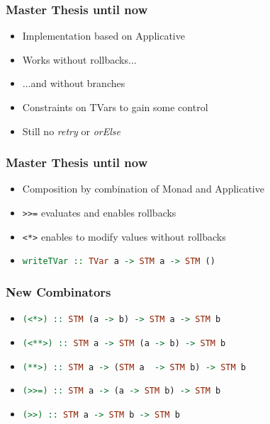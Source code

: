 \documentclass{beamer}
\begin{document}
  
  \begin{frame}
   \frametitle{Master Thesis until now}
   \begin{itemize}\setlength\itemsep{1em}
    \item Implementation based on Applicative 
    \item Works without rollbacks...
    \item ...and without branches
    \item Constraints on TVars to gain some control
    \item Still no \textit{retry} or \textit{orElse}
   \end{itemize}
  \end{frame}


  \begin{frame}
   \frametitle{Master Thesis until now}
   \begin{itemize}\setlength\itemsep{1em}
    \item Composition by combination of Monad and Applicative
    \item\lstinline{>>=} evaluates and enables rollbacks
    \item\lstinline{<*>} enables to modify values without rollbacks
    \item \lstinline[language=Haskell]{writeTVar :: TVar a -> STM a -> STM ()} 
   \end{itemize}
  \end{frame}


  
  \begin{frame}
   \frametitle{New Combinators}
   \begin{itemize}\setlength\itemsep{1em}
    \item \lstinline[language=Haskell]{(<*>) :: STM (a -> b) -> STM a -> STM b}
    \item \lstinline[language=Haskell]{(<**>) :: STM a -> STM (a -> b) -> STM b}
    \item \lstinline[language=Haskell]{(**>) :: STM a -> (STM a  -> STM b) -> STM b}
    \item \lstinline[language=Haskell]{(>>=) :: STM a -> (a -> STM b) -> STM b}
    \item \lstinline[language=Haskell]{(>>) :: STM a -> STM b -> STM b}
   \end{itemize}
  \end{frame}
\end{document}
